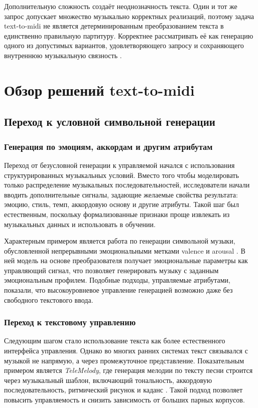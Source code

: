\documentclass[a4paper,12pt]{extarticle}
\begin{document}
Дополнительную сложность создаёт неоднозначность текста. Один и тот же
запрос допускает множество музыкально корректных реализаций, поэтому
задача text-to-midi не является детерминированным преобразованием текста
в единственно правильную партитуру. Корректнее рассматривать её как
генерацию одного из допустимых вариантов, удовлетворяющего запросу и
сохраняющего внутреннюю музыкальную связность
\cite{wu2022texttomusic,lu2023musecoco}.

\section{Обзор решений text-to-midi}

\subsection{Переход к условной символьной генерации}

\subsubsection{Генерация по эмоциям, аккордам и другим атрибутам}

Переход от безусловной генерации к управляемой начался с использования
структурированных музыкальных условий. Вместо того чтобы моделировать
только распределение музыкальных последовательностей, исследователи
начали вводить дополнительные сигналы, задающие желаемые свойства
результата: эмоцию, стиль, темп, аккордовую основу и другие атрибуты.
Такой шаг был естественным, поскольку формализованные признаки проще
извлекать из музыкальных данных и использовать в обучении.

Характерным примером является работа по генерации символьной музыки,
обусловленной непрерывными эмоциональными метками valence и arousal
\cite{sulun2022emotion}. В ней модель на основе преобразователя получает
эмоциональные параметры как управляющий сигнал, что позволяет
генерировать музыку с заданным эмоциональным профилем. Подобные подходы,
управляемые атрибутами, показали, что высокоуровневое управление
генерацией возможно даже без свободного текстового ввода.

\subsubsection{Переход к текстовому управлению}

Следующим шагом стало использование текста как более естественного
интерфейса управления. Однако во многих ранних системах текст
связывался с музыкой не напрямую, а через промежуточное представление.
Показательным примером является \textit{TeleMelody}, где генерация
мелодии по тексту песни строится через музыкальный шаблон, включающий
тональность, аккордовую последовательность, ритмический рисунок и
каданс \cite{ju2022telemelody}. Такой подход позволяет повысить
управляемость и снизить зависимость от больших парных корпусов.
\end{document}
